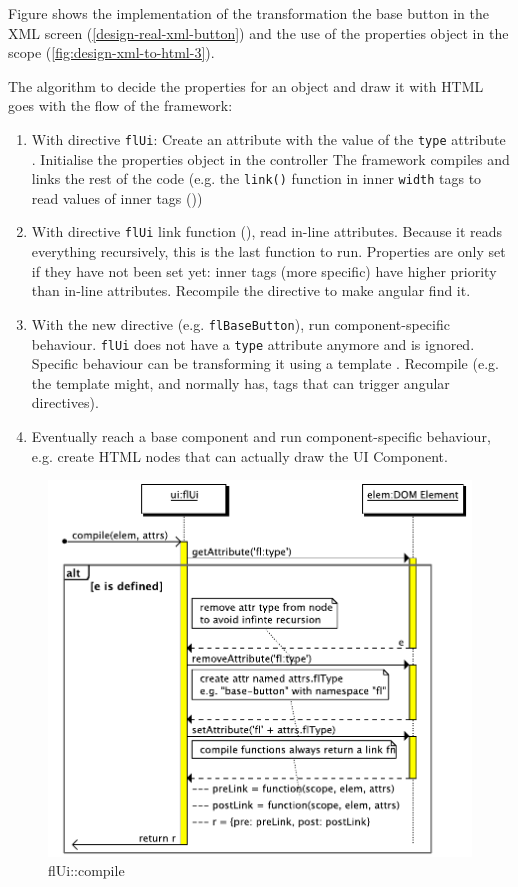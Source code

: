 Figure  shows the implementation of the transformation the base button in the \ac{XML} screen (\ref{design-real-xml-button}) and the use of the properties object in the scope (\ref{fig:design-xml-to-html-3}).

The algorithm to decide the properties for an object and draw it with \ac{HTML} goes with the flow of the framework:
\begin{enumerate}
	\item With directive \texttt{flUi}: Create an attribute with the value of the \texttt{type} attribute . Initialise the properties object in the controller  The framework compiles and links the rest of the code (e.g. the \texttt{link()} function in inner \texttt{width} tags to read values of inner tags ())
	\item With directive \texttt{flUi} link function (), read in-line attributes. Because it reads everything recursively, this is the last function to run. Properties are only set if they have not been set yet: inner tags (more specific) have higher priority than in-line attributes. Recompile the directive to make angular find it. 
	\item With the new directive (e.g. \texttt{flBaseButton}), run component-specific behaviour. \texttt{flUi} does not have a \texttt{type} attribute anymore and is ignored. Specific behaviour can be transforming it using a template . Recompile (e.g. the template might, and normally has, tags that can trigger angular directives).
	\item Eventually reach a base component and run component-specific behaviour, e.g. create \ac{HTML} nodes that can actually draw the UI Component.
\end{enumerate}

\begin{figure}[htb]
    \centering
    \includegraphics{figures/design/seqdia/ui-compile.pdf}
    \caption{flUi::compile}
    \label{fig:design-seqdia-ui-compile}
\end{figure}

